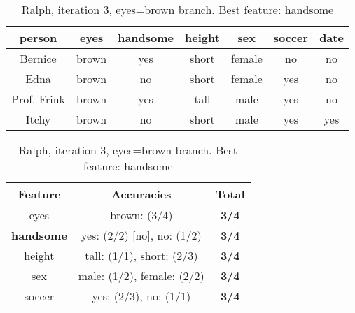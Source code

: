 \begin{table}[h!]
  \centering
  \begin{tabular}{cccccc|c}
    \toprule
    person      & eyes  & handsome & height & sex    & soccer & date\\
    \midrule
    Bernice     & brown & yes      & short  & female & no     & no  \\
    Edna        & brown & no       & short  & female & yes    & no  \\
    Prof. Frink & brown & yes      & tall   & male   & yes    & no  \\
    Itchy       & brown & no       & short  & male   & yes    & yes \\
    \bottomrule
  \end{tabular}

  \vspace{.5cm}

  \begin{tabular}{ccc}
    \toprule
    Feature           & Accuracies                              & Total\\
    \midrule
    eyes              & brown: (3/4)                            & \textbf{3/4}\\
    \textbf{handsome} & yes: (2/2) [no], no: (1/2)              & \textbf{3/4}\\
    height            & tall: (1/1), short: (2/3)               & \textbf{3/4}\\
    sex               & male: (1/2), female: (2/2)              & \textbf{3/4}\\
    soccer            & yes: (2/3), no: (1/1)                   & \textbf{3/4}\\
    \bottomrule
  \end{tabular}
  \caption*{Ralph, iteration 3, eyes=brown branch. Best feature: handsome}
\end{table}

